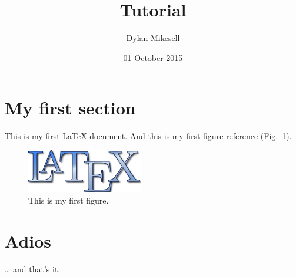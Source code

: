 \documentclass{article}
\author{Dylan Mikesell} %
\title{\latex Tutorial} %
\date{01 October 2015} %
\newcommand{\latex}{\LaTeX\xspace}
\begin{document}
\maketitle %

\newpage

\tableofcontents %

\newpage

\section{My first section} %

This is my first \latex document. And this is my first figure reference (Fig.~\ref{fig:firstFigure}).%

\begin{figure}
	\centering
	\includegraphics[width=0.5\columnwidth]{LaTeXLogo.png}
	\caption{This is my first figure.}
	\label{fig:firstFigure}
\end{figure}

\newpage

\section{Adios} %

\ldots{} and that's it.
\end{document}
